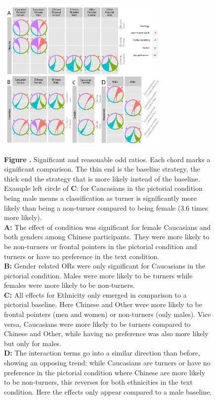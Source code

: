 \documentclass{frontiersSCNS} %
\begin{document}
\begin{figure}[htbp]
\begin{center}
    \includegraphics[width=0.75\textwidth]{figures/odd_ratios.pdf}
\end{center}
\textbf{\label{fig:05} Figure .}{  Significant and reasonable odd ratios. Each chord marks a significant comparison. The thin end is the baseline strategy, the thick end the strategy that is more likely instead of the baseline. Example left circle of \textbf{C}: for Caucasians in the pictorial condition being male means a classification as turner is significantly more likely than being a non-turner compared to being female (3.6 times more likely). \\
   \textbf{A:} The effect of condition was significant for female Caucasians and both genders among Chinese participants. They were more likely to be non-turners or frontal pointers in the pictorial condition and turners or have no preference in the text condition. \\
   \textbf{B:} Gender related ORs were only significant for Caucasians in the pictorial condition. Males were more likely to be turners while females were more likely to be non-turners. \\
   \textbf{C:} All effects for Ethnicity only emerged in comparison to a pictorial baseline. Here Chinese and Other were more likely to be frontal pointers (men and women) or non-turners (only males). Vice versa, Caucasians were more likely to be turners compared to Chinese and Other, while having no preference was also more likely but only for males. \\
   \textbf{D:} The interaction terms go into a similar direction than before, showing an opposing trend: while Caucasians are turners or have no preference in the pictorial condition where Chinese are more likely to be non-turners, this reverses for both ethnicities in the text condition. Here the effects only appear compared to a male baseline.}
   \label{fig:odd_ratios}
\end{figure}
\end{document}
